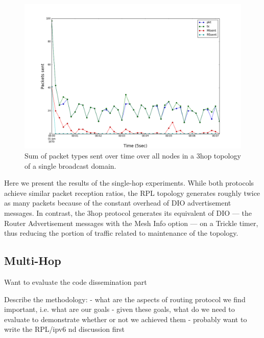 \begin{figure}[t]
\centering
\includegraphics[width=\linewidth]{figs/3hop_single_hop.png}
\caption{Sum of packet types sent over time over all nodes in a 3hop topology of a single broadcast domain.}
\label{fig:3hop_single_hop}
\end{figure}


Here we present the results of the single-hop experiments.
While both protocols achieve similar packet reception ratios, the RPL topology generates roughly twice as many packets because of the constant overhead of DIO advertisement messages.
In contrast, the 3hop protocol generates its equivalent of DIO --- the Router Advertisement messages with the Mesh Info option --- on a Trickle timer, thus reducing the portion of traffic related to maintenance of the topology.

\subsection{Multi-Hop}

Want to evaluate the code dissemination part

Describe the methodology:
- what are the aspects of routing protocol we find important, i.e. what are our goals
- given these goals, what do we need to evaluate to demonstrate whether or not we achieved them
- probably want to write the RPL/ipv6 nd discussion first
\fi

